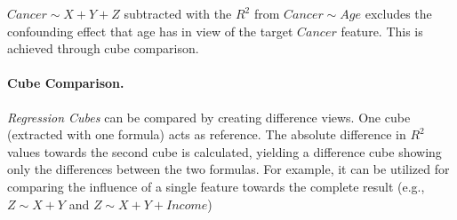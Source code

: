 \documentclass[journal]{style/vgtc} 			          %
\begin{document}
$Cancer \sim X + Y + Z$ subtracted with the $R^2$ from $Cancer \sim Age$ excludes the confounding effect that age has in view of the target $Cancer$ feature.
This is achieved through cube comparison.

\paragraph{Cube Comparison.}
\emph{Regression Cubes} can be compared by creating difference views.
One cube (extracted with one formula) acts as reference.
The absolute difference in $R^2$ values towards the second cube is calculated, yielding a difference cube showing only the differences between the two formulas.
For example, it can be utilized for comparing the influence of a single feature towards the complete result (e.g., $Z \sim X + Y$ and $Z \sim X + Y + Income$)
\end{document}
